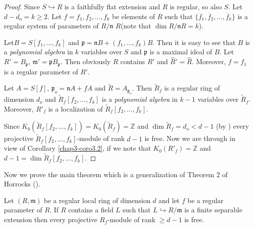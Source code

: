 \begin{proof}
Since $S\hookrightarrow R$ is a faithfully flat extension and $R$ is
regular, so also $S$. Let $d-d_{o}=k\geq 2$. Let
$f=f_{1},f_{2},\ldots,f_{k}$ be elements of $R$ such that
$\{\overline{f}_{1},\overline{f}_{2},\ldots,\overline{f}_{k}\}$ is a
regular system of parameters of $R/\mathfrak{n}$ $R$(note that $\dim
R/\mathfrak{n}R=k$). 

Let\pageoriginale $B=S[f_{1},\ldots,f_{k}]$ and
$\mathfrak{p}=\mathfrak{n}B+(f_{1},\ldots,f_{k})B$. Then it is easy to
see that $B$ is a {\em polynomial algebra} in $k$ variables over $S$
and $\mathfrak{p}$ is a maximal ideal of $B$. Let
$R'=B_{\mathfrak{p}}$,
$\mathfrak{m}'=\mathfrak{p}B_{\mathfrak{p}}$. Then obviously $R$
contains $R'$ and $\widehat{R}'=\widehat{R}$. Moreover, $f=f_{1}$ is a
regular parameter of $R'$.

Let $A=S[f]$, $\mathfrak{p}_{o}=\mathfrak{n}A+fA$ and
$\widetilde{R}=A_{\mathfrak{p}_{o}}$. Then $\widetilde{R}_{f}$ is a
regular ring of dimension $d_{o}$ and
$\widetilde{R}_{f}[f_{2},\ldots,f_{k}]$ is a {\em polynomial algebra}
in $k-1$ variables over $\widetilde{R}_{f}$. Moreover, $R'_{f}$ is a
localization of $\widetilde{R}_{f}[f_{2},\ldots,f_{k}]$. 

Since
$K_{0}(\widetilde{R}_{f}[f_{2},\ldots,f_{k}])=K_{0}(\widetilde{R}_{f})=\mathbb{Z}$
and $\dim \widetilde{R}_{f}=d_{o}<d-1$ (by \cite[Theorem 1.1]{chap3-Sw})
every projective $\widetilde{R}_{f}[f_{2},\ldots,f_{k}]$-module of
rank $d-1$ is free. Now we are through in view of
Corollary \ref{chap3-coro3.2}, if we note that
$K_{0}(R'_{f})=\mathbb{Z}$ and
$d-1=\dim \widetilde{R}_{f}[f_{2},\ldots,f_{k}]$. 
\end{proof}

Now we prove the main theorem which is a generalization of Theorem 2
of Horrocks (\cite{chap3-H}).

\begin{theorem}\label{chap3-thm3.5}
Let $(R,\mathfrak{m})$ be a regular local ring of dimension $d$ and
let $f$ be a regular parameter of $R$. If $R$ contains a field $L$
such that $L\hookrightarrow R/\mathfrak{m}$ is a finite separable
extension then every projective $R_{f}$-module of rank $\geq d-1$ is
free. 
\end{theorem}

